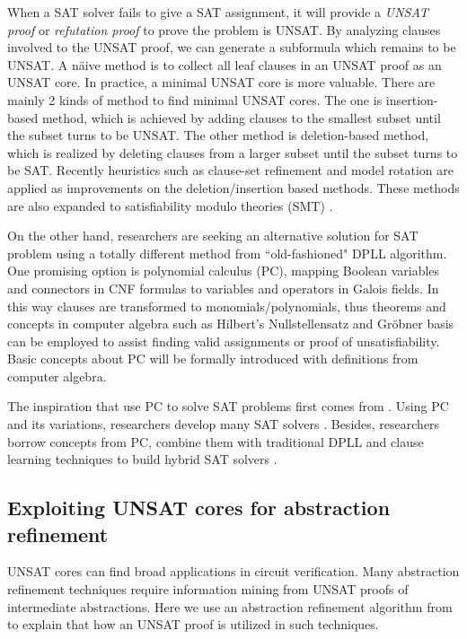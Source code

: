 When a SAT solver fails to give a SAT assignment, it will provide a {\it UNSAT proof} or {\it refutation proof}
to prove the problem is UNSAT. By analyzing clauses involved to the UNSAT proof, we can 
generate a subformula which remains to be UNSAT. A n\"aive method is to collect all leaf 
clauses in an UNSAT proof as an UNSAT core. In practice, a minimal UNSAT core is more valuable.
There are mainly 2 kinds of method to find minimal UNSAT cores.
The one is insertion-based method, which is achieved by adding clauses to the smallest subset 
until the subset turns to be UNSAT. The other method is deletion-based method,
which is realized by deleting clauses from a larger subset until the subset turns to be SAT.
Recently heuristics such as clause-set refinement \cite{modelrotation} and model rotation \cite{belov2011accelerating}
are applied as improvements on the deletion/insertion based methods.
These methods are also expanded to satisfiability modulo theories (SMT) \cite{cimatti2007simple}.

On the other hand, researchers are seeking an alternative solution for SAT problem using a totally
different method from ``old-fashioned" DPLL algorithm. One promising option is polynomial calculus (PC),
mapping Boolean variables and connectors in CNF formulas to variables and operators in 
Galois fields. In this way clauses are transformed to monomials/polynomials, thus theorems and concepts in computer
algebra such as Hilbert's Nullstellensatz and Gr\"obner basis can be employed to assist finding
valid assignments or proof of unsatisfiability. Basic concepts about PC will be formally introduced with definitions
from computer algebra.

The inspiration that use PC to solve SAT problems first comes from \cite{ceiSTOC96}.
Using PC and its variations, researchers develop many SAT solvers \cite{STABLE,BLUEVERI,PolyBoRi}. 
Besides, researchers borrow concepts from PC, combine them with traditional DPLL and clause learning techniques
to build hybrid SAT solvers \cite{condratTACAS07,Zengler2010}.

\subsection{Exploiting UNSAT cores for abstraction refinement}

UNSAT cores can find broad applications in circuit verification. Many abstraction refinement techniques require 
information mining from UNSAT proofs of intermediate abstractions. 
Here we use an abstraction refinement algorithm from \cite{zhang2005design} to explain that how an UNSAT proof is
utilized in such techniques.

